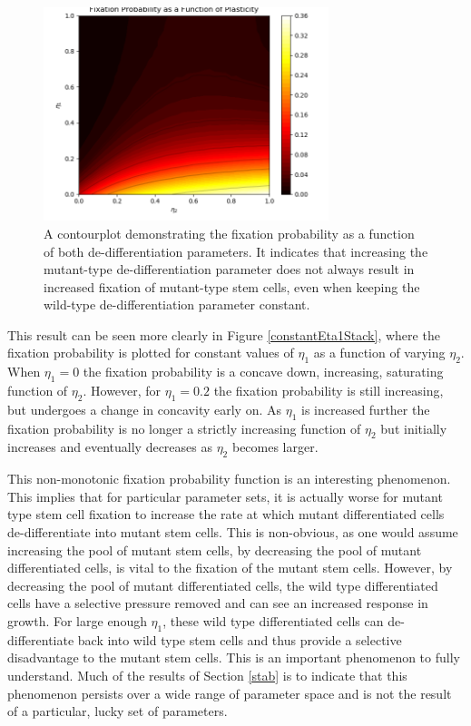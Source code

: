 \documentclass[12pt]{article}
\begin{document}
\begin{figure}[H]
\begin{center}
\includegraphics[width=0.74\textwidth]{contourplot.png}
\end{center}
\caption{A contourplot demonstrating the fixation probability as a function of both de-differentiation parameters. It indicates that increasing the mutant-type de-differentiation parameter does not always result in increased fixation of mutant-type stem cells, even when keeping the wild-type de-differentiation parameter constant.}\label{contour}
\end{figure}

This result can be seen more clearly in Figure \ref{constantEta1Stack}, where the fixation probability is plotted for constant values of $\eta_1$ as a function of varying $\eta_2$. When $\eta_1=0$ the fixation probability is a concave down, increasing, saturating function of $\eta_2$. However, for $\eta_1=0.2$ the fixation probability is still increasing, but undergoes a change in concavity early on. As $\eta_1$ is increased further the fixation probability is no longer a strictly increasing function of $\eta_2$ but initially increases and eventually decreases as $\eta_2$ becomes larger. 

This non-monotonic fixation probability function is an interesting phenomenon. This implies that for particular parameter sets, it is actually worse for mutant type stem cell fixation to increase the rate at which mutant differentiated cells de-differentiate into mutant stem cells. This is non-obvious, as one would assume increasing the pool of mutant stem cells, by decreasing the pool of mutant differentiated cells, is vital to the fixation of the mutant stem cells. However, by decreasing the pool of mutant differentiated cells, the wild type differentiated cells have a selective pressure removed and can see an increased response in growth. For large enough $\eta_1$, these wild type differentiated cells can de-differentiate back into wild type stem cells and thus provide a selective disadvantage to the mutant stem cells. This is an important phenomenon to fully understand. Much of the results of Section \ref{stab} is to indicate that this phenomenon persists over a wide range of parameter space and is not the result of a particular, lucky set of parameters.
\end{document}
